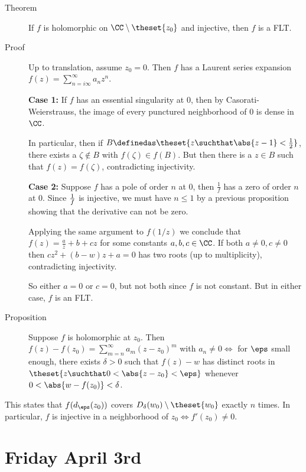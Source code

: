 \begin{description}
\item[Theorem]
If \(f\) is holomorphic on \(\CC\setminus\theset{z_0}\) and injective,
then \(f\) is a FLT.
\item[Proof]
Up to translation, assume \(z_0 = 0\). Then \(f\) has a Laurent series
expansion \(f(z) = \sum_{n=i\infty}^\infty a_n z^n\).

\hfill\break

\textbf{Case 1:} If \(f\) has an essential singularity at 0, then by
Casorati-Weierstrauss, the image of every punctured neighborhood of 0 is
dense in \(\CC\).

\hfill\break

In particular, then if
\(B \definedas \theset{z \suchthat \abs{z-1} < {1 \over 2}}\), there
exists a \(\zeta\not\in B\) with \(f(\zeta) \in f(B)\). But then there
is a \(z\in B\) such that \(f(z) = f(\zeta)\), contradicting
injectivity.

\hfill\break

\textbf{Case 2:} Suppose \(f\) has a pole of order \(n\) at 0, then
\(\frac 1 f\) has a zero of order \(n\) at 0. Since \(1 \over f\) is
injective, we must have \(n\leq 1\) by a previous proposition showing
that the derivative can not be zero.

\hfill\break

Applying the same argument to \(f(1/z)\) we conclude that
\(f(z) = \frac a z + b + cz\) for some constants \(a,b,c\in \CC\). If
both \(a\neq 0, c\neq 0\) then \(cz^2 + (b-w)z + a = 0\) has two roots
(up to multiplicity), contradicting injectivity.

\hfill\break

So either \(a=0\) or \(c=0\), but not both since \(f\) is not constant.
But in either case, \(f\) is an FLT.
\item[Proposition]
Suppose \(f\) is holomorphic at \(z_0\). Then
\(f(z) - f(z_0) = \sum_{m=n}^\infty a_m(z-z_0)^m\) with
\(a_n \neq 0 \iff\) for \(\eps\) small enough, there exists
\(\delta > 0\) such that \(f(z) - w\) has distinct roots in
\(\theset{z\suchthat 0 < \abs{z-z_0} < \eps}\) whenever
\(0 < \abs{w - f(z_0)} < \delta\).
\end{description}

This states that \(f(d_\eps(z_0))\) covers
\(D_\delta(w_0) \setminus\theset{w_0}\) exactly \(n\) times. In
particular, \(f\) is injective in a neighborhood of
\(z_0 \iff f'(z_0) \neq 0\).

\hypertarget{friday-april-3rd}{%
\section{Friday April 3rd}\label{friday-april-3rd}}

